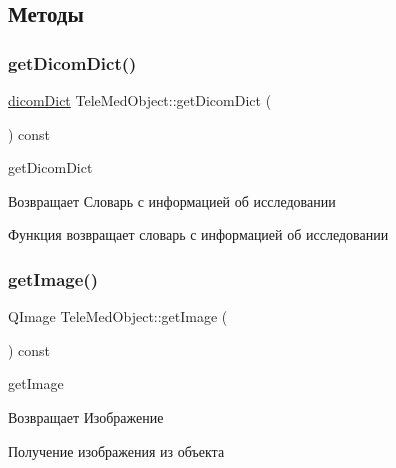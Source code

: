 \subsection{Методы}
\mbox{\label{classTeleMedObject_a66119d8882d0e8319d337a559bfa78a3}} 
\subsubsection{\texorpdfstring{get\+Dicom\+Dict()}{getDicomDict()}}
{\footnotesize\ttfamily \hyperlink{tagshelpers_8h_ae25d30658f61420b88a380dc9e40bb74}{dicom\+Dict} Tele\+Med\+Object\+::get\+Dicom\+Dict (\begin{DoxyParamCaption}{ }\end{DoxyParamCaption}) const}



get\+Dicom\+Dict 

\begin{DoxyReturn}{Возвращает}
Словарь с информацией об исследовании
\end{DoxyReturn}
Функция возвращает словарь с информацией об исследовании \mbox{\label{classTeleMedObject_a69c34b50bb901268d193bbbb7a7698c5}} 
\subsubsection{\texorpdfstring{get\+Image()}{getImage()}}
{\footnotesize\ttfamily Q\+Image Tele\+Med\+Object\+::get\+Image (\begin{DoxyParamCaption}{ }\end{DoxyParamCaption}) const}



get\+Image 

\begin{DoxyReturn}{Возвращает}
Изображение
\end{DoxyReturn}
Получение изображения из объекта \mbox{\label{classTeleMedObject_a56def4aa26d190a557014d9a3d99099f}} 
